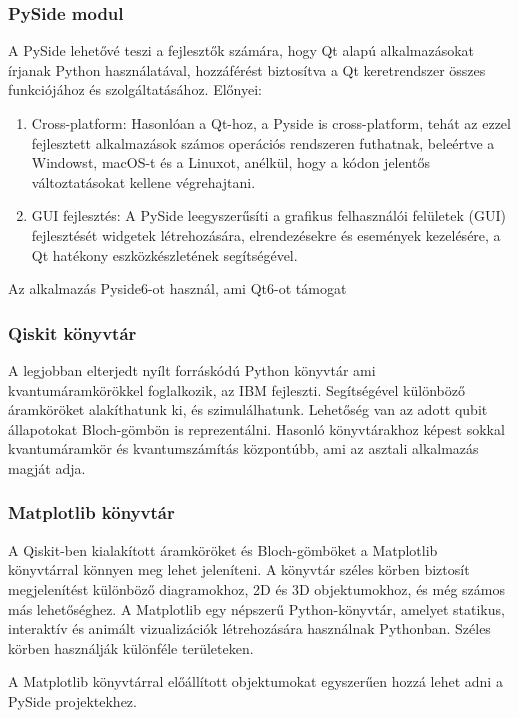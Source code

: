 \documentclass[
]{thesis-ekf}
\theoremstyle{definition}
\theoremstyle{remark}
\begin{document}
\subsubsection{PySide modul}
A PySide lehetővé teszi a fejlesztők számára, hogy Qt alapú alkalmazásokat írjanak Python használatával, hozzáférést biztosítva a Qt keretrendszer összes funkciójához és szolgáltatásához. Előnyei:
\begin{enumerate}
	\item Cross-platform: Hasonlóan a Qt-hoz, a Pyside is cross-platform, tehát az ezzel fejlesztett alkalmazások számos operációs rendszeren futhatnak, beleértve a Windowst, macOS-t és a Linuxot, anélkül, hogy a kódon jelentős változtatásokat kellene végrehajtani.
	\item GUI fejlesztés: A PySide leegyszerűsíti a grafikus felhasználói felületek (GUI) fejlesztését widgetek létrehozására, elrendezésekre és események kezelésére, a Qt hatékony eszközkészletének segítségével.
\end{enumerate}

Az alkalmazás Pyside6-ot használ, ami Qt6-ot támogat

\subsubsection{Qiskit könyvtár}
A legjobban elterjedt nyílt forráskódú Python könyvtár ami kvantumáramkörökkel foglalkozik, az IBM fejleszti. Segítségével különböző áramköröket alakíthatunk ki, és szimulálhatunk. Lehetőség van az adott qubit állapotokat Bloch-gömbön is reprezentálni. Hasonló könyvtárakhoz képest sokkal kvantumáramkör és kvantumszámítás központúbb, ami az asztali alkalmazás magját adja.\cite{Qiskit}

\subsubsection{Matplotlib könyvtár}
A Qiskit-ben kialakított áramköröket és Bloch-gömböket a Matplotlib könyvtárral könnyen meg lehet jeleníteni. A könyvtár széles körben biztosít megjelenítést különböző diagramokhoz, 2D és 3D objektumokhoz, és még számos más lehetőséghez. A Matplotlib egy népszerű Python-könyvtár, amelyet statikus, interaktív és animált vizualizációk létrehozására használnak Pythonban. Széles körben használják különféle területeken.

A Matplotlib könyvtárral előállított objektumokat egyszerűen hozzá lehet adni a PySide projektekhez. 
\end{document}

